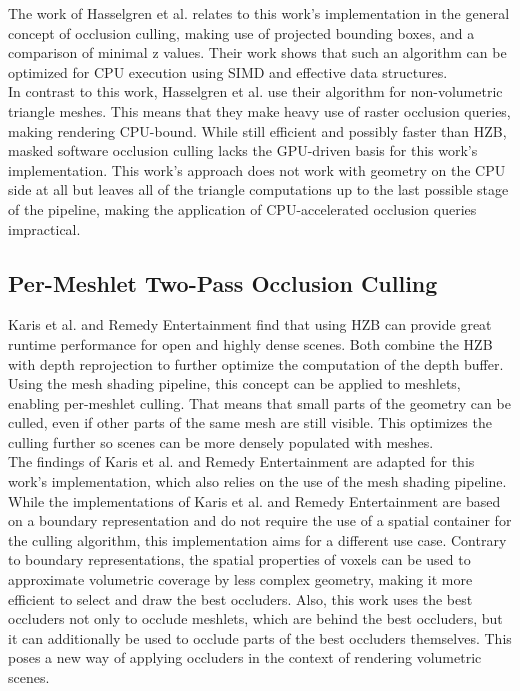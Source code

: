 \noindent
The work of Hasselgren et al. relates to this work's implementation in the general concept of occlusion culling, making 
use of projected bounding boxes, and a comparison of minimal z values. Their work shows that such an algorithm can be 
optimized for \ac{CPU} execution using \ac{SIMD} and effective data structures. \\

\noindent 
In contrast to this work, Hasselgren et al. use their algorithm for non-volumetric triangle meshes. This means that 
they make heavy use of raster occlusion queries, making rendering CPU-bound. While still efficient and possibly faster 
than \ac{HZB}, masked software occlusion culling lacks the \ac{GPU}-driven basis for this work's implementation. This 
work's approach does not work with geometry on the \ac{CPU} side at all but leaves all of the triangle computations up 
to the last possible stage of the pipeline, making the application of \ac{CPU}-accelerated occlusion queries impractical.


\subsection*{Per-Meshlet Two-Pass Occlusion Culling}

Karis et al. \cite{Karis2021} and Remedy Entertainment \cite{Remedy2023} find that using \ac{HZB} can provide great 
runtime performance for open and highly dense scenes. Both combine the \ac{HZB} with depth reprojection to further optimize 
the computation of the depth buffer. Using the mesh shading pipeline, this concept can be applied to meshlets, enabling 
per-meshlet culling. That means that small parts of the geometry can be culled, even if other parts of the same mesh are 
still visible. This optimizes the culling further so scenes can be more densely populated with meshes. \\

\noindent
The findings of Karis et al. and Remedy Entertainment are adapted for this work's implementation, which also relies on 
the use of the mesh shading pipeline. While the implementations of Karis et al. and Remedy Entertainment are based on 
a boundary representation and do not require the use of a spatial container for the culling algorithm, this 
implementation aims for a different use case. Contrary to boundary representations, the spatial properties of voxels 
can be used to approximate volumetric coverage by less complex geometry, making it more efficient to select and draw the 
best occluders. Also, this work uses the best occluders not only to occlude meshlets, which are behind the best occluders, 
but it can additionally be used to occlude parts of the best occluders themselves. This poses a new way of applying occluders 
in the context of rendering volumetric scenes.
